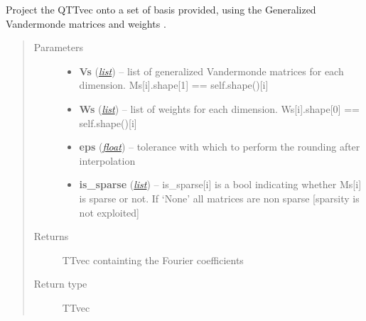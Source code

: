 \documentclass[a4paper,10pt,english]{sphinxmanual}
\begin{document}
\begin{fulllineitems}
\begin{fulllineitems}
\label{api-qttvec:TensorToolbox.core.QTTvec.project}
Project the QTTvec onto a set of basis provided, using the Generalized Vandermonde matrices  and weights .
\begin{quote}\begin{description}
\item[{Parameters}] \leavevmode\begin{itemize}
\item {} 
\textbf{Vs} (\href{http://docs.python.org/library/functions.html\#list}{\emph{list}}) -- list of generalized Vandermonde matrices for each dimension. Ms{[}i{]}.shape{[}1{]} == self.shape(){[}i{]}

\item {} 
\textbf{Ws} (\href{http://docs.python.org/library/functions.html\#list}{\emph{list}}) -- list of weights for each dimension. Ws{[}i{]}.shape{[}0{]} == self.shape(){[}i{]}

\item {} 
\textbf{eps} (\href{http://docs.python.org/library/functions.html\#float}{\emph{float}}) -- tolerance with which to perform the rounding after interpolation

\item {} 
\textbf{is\_sparse} (\href{http://docs.python.org/library/functions.html\#list}{\emph{list}}) -- is\_sparse{[}i{]} is a bool indicating whether Ms{[}i{]} is sparse or not. If `None' all matrices are non sparse {[}sparsity is not exploited{]}

\end{itemize}

\item[{Returns}] \leavevmode
TTvec containting the Fourier coefficients

\item[{Return type}] \leavevmode
TTvec

\end{description}\end{quote}


\end{fulllineitems}
\end{fulllineitems}
\end{document}
